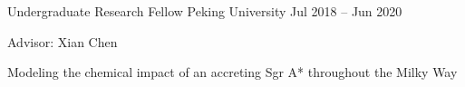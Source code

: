 \begin{cventries}
    
    \cvsimpentry
    {Undergraduate Research Fellow} %
    {Peking University} %
    {Jul 2018 -- Jun 2020} %
    {\begin{cvitems}
        \item Advisor: Xian Chen
        \item Modeling the chemical impact of an accreting Sgr A* throughout the Milky Way\dagger
    \end{cvitems}}

\end{cventries}
